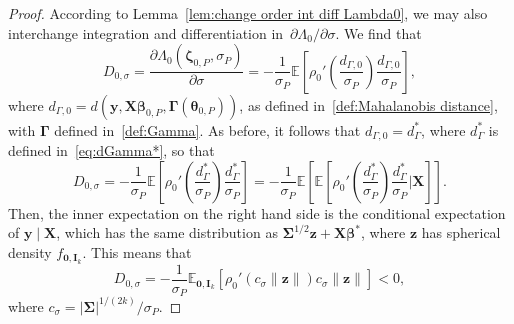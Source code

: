 \documentclass{article}
\numberwithin{equation}{section}
\theoremstyle{plain}
\newcommand{\bbeta}{\bm\beta}
\newcommand{\btheta}{\bm\theta}
\newcommand{\bSigma}{\mathbf{\Sigma}}
\newcommand{\bGamma}{\bm\Gamma}
\newcommand{\bzeta}{\bm\zeta}
\newcommand{\by}{\mathbf{y}}
\newcommand{\bz}{\mathbf{z}}
\newcommand{\bX}{\mathbf{X}}
\newcommand{\bI}{\mathbf{I}}
\newcommand{\E}{\mathbb{E}}
\begin{document}
\begin{proof}
According to Lemma~\ref{lem:change order int diff Lambda0},
we may also interchange integration and differentiation in~$\partial\Lambda_0/\partial\sigma$.
We find that
\[
D_{0,\sigma}
=
\frac{\partial\Lambda_0(\bzeta_{0,P},\sigma_P)}{\partial\sigma}
=
-
\frac{1}{\sigma_P}
\E\left[
\rho_0'\left(\frac{d_{\Gamma,0}}{\sigma_P}\right)\frac{d_{\Gamma,0}}{\sigma_P}
\right],
\]
where $d_{\Gamma,0}=d(\by,\bX\bbeta_{0,P},\bGamma(\btheta_{0,P}))$,
as defined in~\eqref{def:Mahalanobis distance},
with $\bGamma$ defined in~\eqref{def:Gamma}.
As before, it follows that $d_{\Gamma,0}=d_{\Gamma}^*$, where $d_{\Gamma}^*$ is defined in~\eqref{eq:dGamma*},
so that 
\[
D_{0,\sigma}
=
-
\frac{1}{\sigma_P}
\E\left[
\rho_0'\left(\frac{d_{\Gamma}^*}{\sigma_P}\right)\frac{d_{\Gamma}^*}{\sigma_P}
\right]
=
-
\frac{1}{\sigma_P}
\E\left[
\E\left[
\rho_0'\left(\frac{d_{\Gamma}^*}{\sigma_P}\right)\frac{d_{\Gamma}^*}{\sigma_P}
\bigg|
\bX
\right]
\right].
\]
Then, the inner expectation on the right hand side is the conditional expectation
of $\by\mid\bX$, which has the same distribution as $\bSigma^{1/2}\bz+\bX\bbeta^*$,
where $\bz$ has spherical density $f_{\mathbf{0},\bI_k}$.
This means that 
\begin{equation}
\label{eq:D0sigma}
D_{0,\sigma}=
-\frac{1}{\sigma_P}
\E_{\mathbf{0},\bI_k}
\left[
\rho_0'
\left(
c_\sigma\|\bz\|
\right)
c_\sigma\|\bz\|
\right]
<0,
\end{equation}
where $c_\sigma=|\bSigma|^{1/(2k)}/\sigma_P$.
\end{proof}
\end{document}

